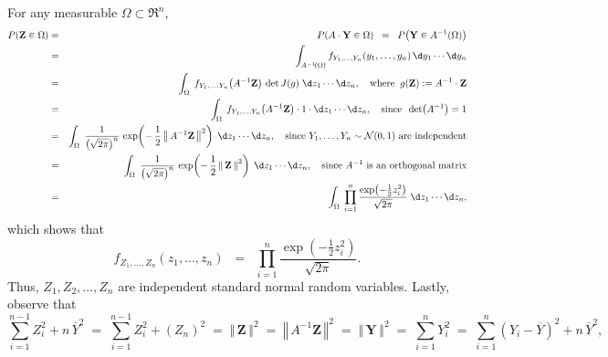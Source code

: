 \documentclass{article}
\begin{document}
For any measurable $\Omega \subset \Re^{n}$,
\begin{eqnarray*}
          P\!\left(\mathbf{Z}\in\Omega\right)
& = & P\!\left(A\cdot\mathbf{Y}\in\Omega\right) \;\; = \;\; P\!\left(\mathbf{Y}\in A^{-1}\!\left(\Omega\right)\right) \\
& = & \int_{A^{-1}\!\left(\Omega\right)} f_{Y_{1},\ldots,Y_{n}}(y_{1},\ldots,y_{n})\,\d y_{1} \cdots \d y_{n} \\
& = & \int_{\Omega}\;f_{Y_{1},\ldots,Y_{n}}\!\left(A^{-1}\mathbf{Z}\right)\,\det J(g)\;\d z_{1} \cdots \d z_{n},
          \quad\textnormal{where}\;\; g\!\left(\mathbf{Z}\right) := A^{-1}\cdot\mathbf{Z} \\
& = & \int_{\Omega}\;f_{Y_{1},\ldots,Y_{n}}\!\left(A^{-1}\mathbf{Z}\right)\cdot1\cdot\d z_{1} \cdots \d z_{n},
          \quad\textnormal{since}\;\; \det\!\left(A^{-1}\right) = 1 \\
& = & \int_{\Omega}\;
          \frac{1}{\left(\sqrt{2\pi}\right)^{n}}\,\exp\!\left(-\,\frac{1}{2}\left\Vert\,A^{-1}\mathbf{Z}\,\right\Vert^{2}\right)
          \;\d z_{1} \cdots \d z_{n},
          \quad\textnormal{since $Y_{1}, \ldots, Y_{n} \sim \mathcal{N}(0,1)$ are independent} \\
& = & \int_{\Omega}\;
          \frac{1}{\left(\sqrt{2\pi}\right)^{n}}\,\exp\!\left(-\,\frac{1}{2}\left\Vert\,\mathbf{Z}\,\right\Vert^{2}\right)
          \;\d z_{1} \cdots \d z_{n},
          \quad\textnormal{since $A^{-1}$ is an orthogonal matrix} \\
& = & \int_{\Omega}\;
          \prod_{i=1}^{n}\frac{\exp\!\left(-\frac{1}{2} z_{i}^{2}\right)}{\sqrt{2\pi}}
          \;\d z_{1} \cdots \d z_{n},
\end{eqnarray*}
which shows that 
\begin{equation*}
f_{Z_{1},\ldots,Z_{n}}(z_{1},\ldots,z_{n}) \;\; = \;\; \prod_{i=1}^{n}\frac{\exp\!\left(-\frac{1}{2} z_{i}^{2}\right)}{\sqrt{2\pi}}.
\end{equation*}
Thus, $Z_{1}, Z_{2}, \ldots, Z_{n}$ are independent standard normal random variables.
Lastly, observe that
\begin{equation*}
       \sum_{i=1}^{n-1}Z_{i}^{2} + n\,\overline{Y}^{2}
\;=\; \sum_{i=1}^{n-1}Z_{i}^{2} + \left(Z_{n}\right)^{2}
\;=\; \left\Vert\,\mathbf{Z}\,\right\Vert^{2}
\;=\; \left\Vert\,A^{-1}\mathbf{Z}\,\right\Vert^{2}
\;=\; \left\Vert\,\mathbf{Y}\,\right\Vert^{2}
\;=\; \sum_{i=1}^{n}Y_{i}^{2}
\;=\; \sum_{i=1}^{n}\left(Y_{i}-\overline{Y}\right)^{2} + n\,\overline{Y}^{2},
\end{equation*}
\end{document}
